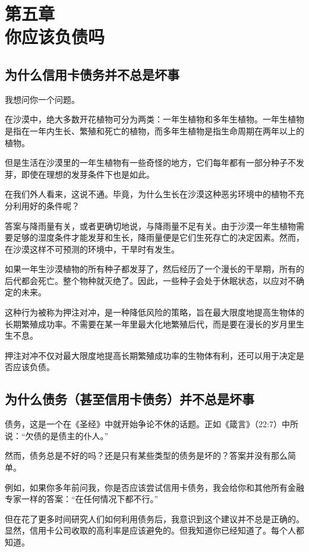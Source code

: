 \section[第五章\q 你应该负债吗]{第五章\\ 你应该负债吗}
\renewcommand{\bookchapter}{5}
\setcounter{figure}{0}
\setcounter{table}{0}
\subsection{为什么信用卡债务并不总是坏事}
我想问你一个问题。

在沙漠中，绝大多数开花植物可分为两类：一年生植物和多年生植物。一年生植物是指在一年内生长、繁殖和死亡的植物，而多年生植物是指生命周期在两年以上的植物。

但是生活在沙漠里的一年生植物有一些奇怪的地方，它们每年都有一部分种子不发芽，即使在理想的发芽条件下也是如此。

在我们外人看来，这说不通。毕竟，为什么生长在沙漠这种恶劣环境中的植物不充分利用好的条件呢？

答案与降雨量有关，或者更确切地说，与降雨量不足有关。由于沙漠一年生植物需要足够的湿度条件才能发芽和生长，降雨量便是它们生死存亡的决定因素。然而，在沙漠这样不可预测的环境中，干旱时有发生。

如果一年生沙漠植物的所有种子都发芽了，然后经历了一个漫长的干旱期，所有的后代都会死亡。整个物种就灭绝了。因此，一些种子会处于休眠状态，以应对不确定的未来。

这种行为被称为押注对冲，是一种降低风险的策略，旨在最大限度地提高生物体的长期繁殖成功率。不需要在某一年里最大化地繁殖后代，而是要在漫长的岁月里生生不息。

押注对冲不仅对最大限度地提高长期繁殖成功率的生物体有利，还可以用于决定是否应该负债。

\subsection{为什么债务（甚至信用卡债务）并不总是坏事}
债务，这是一个在《圣经》中就开始争论不休的话题。正如《箴言》（22:7）中所说：“欠债的是债主的仆人。”

然而，债务总是不好的吗？还是只有某些类型的债务是坏的？答案并没有那么简单。

例如，如果你多年前问我，你是否应该尝试信用卡债务，我会给你和其他所有金融专家一样的答案：“在任何情况下都不行。”

但在花了更多时间研究人们如何利用债务后，我意识到这个建议并不总是正确的。显然，信用卡公司收取的高利率是应该避免的。但我知道你已经知道了。每个人都知道。

